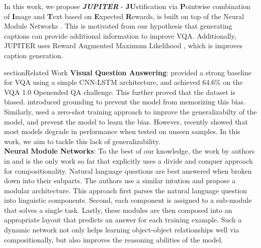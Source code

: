 In this work, we propose \textbf{\textit{JUPITER}} - \textbf{JU}stification via \textbf{P}ointwise combination of \textbf{I}mage and \textbf{T}ext based on \textbf{E}xpected \textbf{R}ewards, is built on top of the Neural Module Networks \cite{HuARDS17}. This is motivated from our hypothesis that generating captions can provide additional information to improve VQA. Additionally, JUPITER uses Reward Augmented Maximum Likelihood \cite{RAML}, which is improves caption generation.

section{Related Work}
\noindent\textbf{Visual Question Answering}: \cite{KazemiE17} provided a strong baseline for VQA using a simple CNN-LSTM architecture, and achieved 64.6\% on the VQA 1.0 Openended QA challenge. This further proved that the dataset is biased. \cite{AishAgrawal17} introduced grounding to prevent the model from memorizing this bias. Similarly, \cite{li2018zero} used a zero-shot training approach to improve the generalizabilty of the model, and prevent the model to learn the bias. However, recently \cite{AgrawalKBP17} showed that most models degrade in performance when tested on unseen samples. In this work, we aim to tackle this lack of generalizability.
\\

\noindent\textbf{Neural Module Networks}: To the best of our knowledge, the work by authors in \cite{HuARDS17} and \cite{deepmodulenets} is the only work so far that explicitly uses a divide and conquer approach for compositionality. Natural language questions are best answered when broken down into their subparts. The authors use a similar intution and propose a modular architecture. This approach first parses the natural language question into linguistic components. Second, each component is assigned to a sub-module that solves a single task. Lastly, these modules are then composed into an appropriate layout that predicts an answer for each training example. Such a dynamic network not only helps learning object-object relationships well via compositionally, but also improves the reasoning abilities of the model. %

\\

